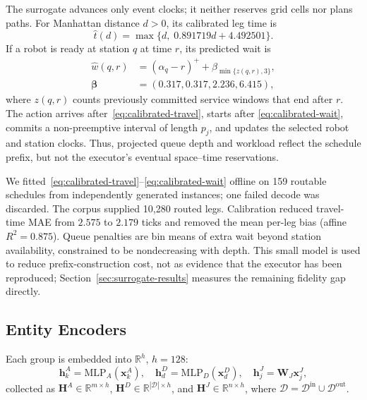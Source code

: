 The surrogate advances only event clocks; it neither reserves grid cells nor
plans paths. For Manhattan distance $d>0$, its calibrated leg time is
\begin{equation}
 \hat t(d)=\max\{d,\;0.891719d+4.492501\}.
 \label{eq:calibrated-travel}
\end{equation}
If a robot is ready at station $q$ at time $r$, its predicted wait is
\begin{align}
 \hat w(q,r)&=(\alpha_q-r)^++\beta_{\min\{z(q,r),3\}},\nonumber\\
 \bm\beta&=(0.317,0.317,2.236,6.415),
 \label{eq:calibrated-wait}
\end{align}
where $z(q,r)$ counts previously committed service windows that end after
$r$. The action arrives after~\eqref{eq:calibrated-travel}, starts after
\eqref{eq:calibrated-wait}, commits a non-preemptive interval of length $p_j$,
and updates the selected robot and station clocks. Thus, projected queue depth
and workload reflect the schedule prefix, but not the executor's eventual
space--time reservations.

We fitted~\eqref{eq:calibrated-travel}--\eqref{eq:calibrated-wait} offline on
159 routable schedules from independently generated instances; one failed
decode was discarded. The corpus supplied 10,280 routed legs. Calibration
reduced travel-time MAE from $2.575$ to $2.179$ ticks and removed the mean
per-leg bias (affine $R^2=0.875$). Queue penalties are bin means of extra wait
beyond station availability, constrained to be nondecreasing with depth. This
small model is used to reduce prefix-construction cost, not as evidence that
the executor has been reproduced; Section~\ref{sec:surrogate-results}
measures the remaining fidelity gap directly.

\subsection{Entity Encoders}
\label{sec:arch-encoders}

Each group is embedded into $\mathbb R^{h}$, $h=128$:
\begin{equation}
 \bm h^A_k=\mathrm{MLP}_A(\bm x^A_k),\quad
 \bm h^D_d=\mathrm{MLP}_D(\bm x^D_d),\quad
 \bm h^J_j=\bm W_J\bm x^J_j ,
 \label{eq:embed}
\end{equation}
collected as $\bm H^A\in\mathbb R^{m\times h}$,
$\bm H^D\in\mathbb R^{|\mathcal D|\times h}$, and
$\bm H^J\in\mathbb R^{n\times h}$, where
$\mathcal D=\mathcal D^{\mathrm{in}}\cup\mathcal D^{\mathrm{out}}$.

